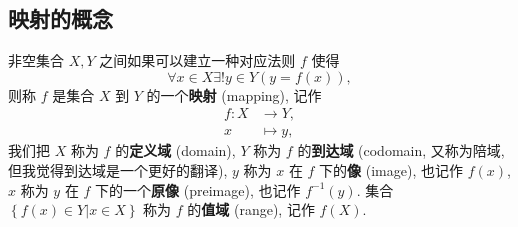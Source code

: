\documentclass[10pt,UTF8]{book} %
\begin{document}
\subsection{映射的概念}

\begin{definition}[映射]
    非空集合 $X, Y$ 之间如果可以建立一种对应法则 $f$ 使得
    \[ \forall x \in X \exists ! y \in Y \left( y = f(x) \right), \]
    则称 $f$ 是集合 $X$ 到 $Y$ 的一个\textbf{映射} (mapping), 记作
    \[ 
    \begin{aligned}
        f:X &\to Y, \\ 
        x &\mapsto y,
    \end{aligned} \]
    我们把 $X$ 称为 $f$ 的\textbf{定义域} (domain), $Y$ 称为 $f$ 的\textbf{到达域}
    (codomain, 又称为陪域, 但我觉得到达域是一个更好的翻译), $y$ 称为 $x$ 在 $f$
    下的\textbf{像} (image), 也记作 $f(x)$, $x$ 称为 $y$ 在 $f$ 下的一个\textbf{原像}
    (preimage), 也记作 $f^{-1}(y)$.
    集合 $\left\{ f(x) \in Y | x \in X \right\}$ 称为 $f$ 的\textbf{值域}
    (range), 记作 $f(X)$.
\end{definition}
\end{document}
